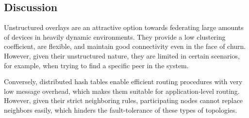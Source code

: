 
\subsection{Discussion}

Unstructured overlays are an attractive option towards federating large amounts of devices in heavily dynamic environments. They provide a low clustering coefficient, are flexible, and maintain good connectivity even in the face of churn. However, given their unstructured nature, they are limited in certain scenarios, for example, when trying to find a specific peer in the system.

Conversely, distributed hash tables enable efficient routing procedures with very low message overhead, which makes them suitable for application-level routing. However, given their strict neighboring rules, participating nodes cannot replace neighbors easily, which hinders the fault-tolerance of these types of topologies.




